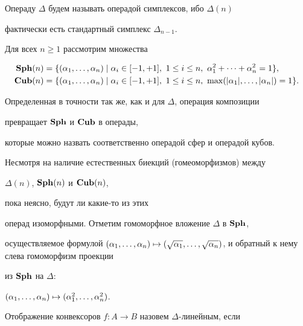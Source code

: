 Операду $\Delta$ будем называть операдой симплексов, ибо $\Delta(n)$


фактически есть стандартный симплекс $\Delta_{n-1}$.





\begin{notenonum}


Для всех $n\ge 1$ рассмотрим множества


\begin{align*}


\bold{Sph}(n)&=\{(\al_1,\dotsc,\al_n)\mid \al_i\in [-1,+1],\ 1\le i\le n,


\ \al_1^2+\dotsb+\al_n^2=1\},\\


%


\bold{Cub}(n)&=\{(\al_1,\dotsc,\al_n)\mid \al_i\in [-1,+1],\ 1\le i\le n,


\ \max(|\al_1|,\dotsc,|\al_n|)=1\}.


\end{align*}





Определенная в точности так же, как и для $\Delta$, операция композиции


превращает $\bold{Sph}$ и $\bold{Cub}$ в операды, 


которые можно назвать соответственно операдой сфер и операдой кубов.


Несмотря на наличие естественных биекций (гомеоморфизмов) между


$\Delta(n)$, $\bold{Sph}(n)$ и $\bold{Cub}(n)$,


пока неясно, будут ли какие-то из этих


операд изоморфными. Отметим гомоморфное вложение $\Delta$ в $\bold{Sph}$,


осуществляемое формулой $(\al_1,\dotsc,\al_n)\mapsto (\sqrt{\al_1},\dotsc,


\sqrt{\al_n})$, и обратный к нему слева гомоморфизм проекции


из $\bold{Sph}$ на $\Delta$:


$(\alpha_1,\dotsc,\alpha_n)\mapsto (\alpha_1^2,\dotsc,\alpha_n^2)$.


\end{notenonum}





Отображение конвексоров $f:A\rightarrow B$ назовем $\Delta$-линейным, если


